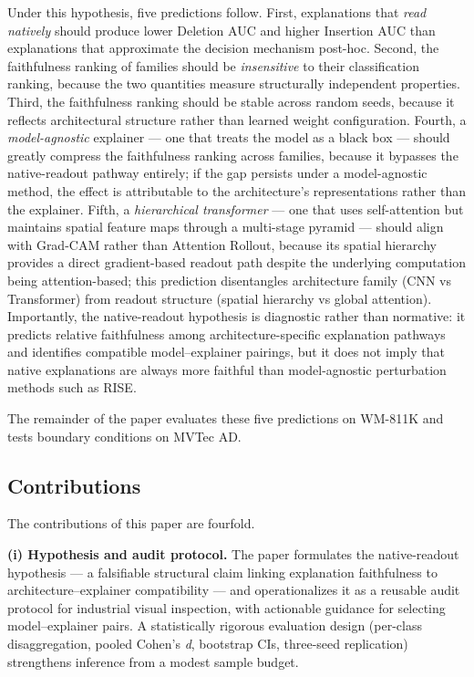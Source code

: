 \documentclass[11pt,a4paper]{article}
\begin{document}
Under this hypothesis, five predictions follow. First, explanations that \emph{read natively} should produce lower Deletion AUC and higher Insertion AUC than explanations that approximate the decision mechanism post-hoc. Second, the faithfulness ranking of families should be \emph{insensitive} to their classification ranking, because the two quantities measure structurally independent properties. Third, the faithfulness ranking should be stable across random seeds, because it reflects architectural structure rather than learned weight configuration. Fourth, a \emph{model-agnostic} explainer --- one that treats the model as a black box --- should greatly compress the faithfulness ranking across families, because it bypasses the native-readout pathway entirely; if the gap persists under a model-agnostic method, the effect is attributable to the architecture's representations rather than
the explainer. Fifth, a \emph{hierarchical transformer} --- one that uses self-attention but maintains spatial feature maps through a multi-stage pyramid --- should align with Grad-CAM rather than Attention Rollout, because its spatial hierarchy provides a direct gradient-based readout path despite the underlying computation being attention-based; this prediction disentangles architecture family (CNN vs Transformer) from readout structure (spatial hierarchy vs global attention). Importantly, the native-readout hypothesis is diagnostic rather than normative: it predicts relative faithfulness among architecture-specific explanation pathways and identifies compatible model--explainer pairings, but it does not imply that native explanations are always more faithful than model-agnostic perturbation methods such as RISE.

The remainder of the paper evaluates these five predictions on WM-811K and tests boundary conditions on MVTec AD.

\subsection{Contributions}

The contributions of this paper are fourfold.

\textbf{(i) Hypothesis and audit protocol.} The paper formulates the native-readout hypothesis --- a falsifiable structural claim linking explanation faithfulness to architecture--explainer compatibility --- and operationalizes it as a reusable audit protocol for industrial visual inspection, with actionable guidance for selecting model--explainer pairs. A statistically rigorous evaluation design (per-class disaggregation, pooled Cohen's \emph{d}, bootstrap CIs, three-seed replication) strengthens inference from a modest sample budget.
\end{document}
